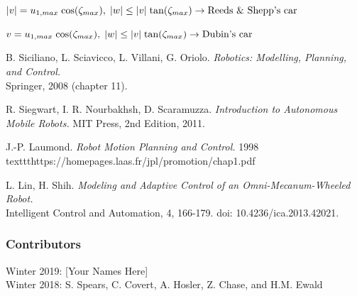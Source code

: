 \documentclass[twoside]{article}
\begin{document}
$
|v|= u_{1,max}\;\textup{cos}(\zeta_{max}),\;|w|\leq |v|\;\textup{tan}(\zeta_{max}) \rightarrow \textup{Reeds \& Shepp's car}
$

$
v= u_{1,max}\;\textup{cos}(\zeta_{max}),\;|w|\leq |v|\;\textup{tan}(\zeta_{max}) \rightarrow \textup{Dubin's car}
$

\begin{thebibliography}{9}

B. Siciliano, L. Sciavicco, L. Villani, G. Oriolo.\textit{ Robotics: Modelling, Planning, and Control.} \\Springer, 2008 (chapter 11).

R. Siegwart, I. R. Nourbakhsh, D. Scaramuzza. \textit{Introduction to Autonomous Mobile Robots.} MIT Press, 2nd Edition, 2011.

J.-P. Laumond. \textit{Robot Motion Planning and Control.} 1998 \\texttt{https://homepages.laas.fr/jpl/promotion/chap1.pdf}

L. Lin, H. Shih. \textit{Modeling and Adaptive Control of an Omni-Mecanum-Wheeled Robot.} \\Intelligent Control and Automation, 4, 166-179. doi: 10.4236/ica.2013.42021.

\end{thebibliography}

\subsubsection*{Contributors}
Winter 2019: [Your Names Here]
\\
Winter 2018: S. Spears, C. Covert, A. Hosler, Z. Chase, and H.M. Ewald
\end{document}
